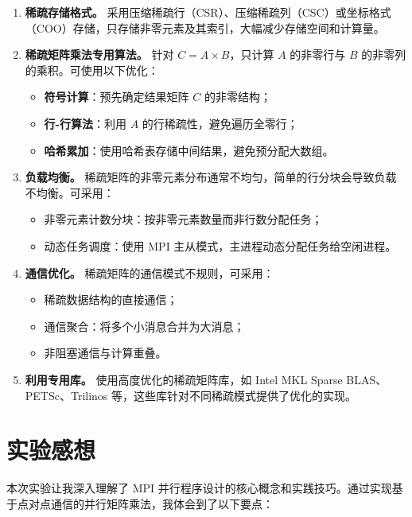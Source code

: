 \documentclass[UTF8,a4paper,12pt]{ctexart}
\begin{document}
\begin{enumerate}[leftmargin=2.2em]
  \item \textbf{稀疏存储格式。} 采用压缩稀疏行（CSR）、压缩稀疏列（CSC）或坐标格式（COO）存储，只存储非零元素及其索引，大幅减少存储空间和计算量。

  \item \textbf{稀疏矩阵乘法专用算法。} 针对 $C = A \times B$，只计算 $A$ 的非零行与 $B$ 的非零列的乘积。可使用以下优化：
  \begin{itemize}
    \item \textbf{符号计算}：预先确定结果矩阵 $C$ 的非零结构；
    \item \textbf{行-行算法}：利用 $A$ 的行稀疏性，避免遍历全零行；
    \item \textbf{哈希累加}：使用哈希表存储中间结果，避免预分配大数组。
  \end{itemize}

  \item \textbf{负载均衡。} 稀疏矩阵的非零元素分布通常不均匀，简单的行分块会导致负载不均衡。可采用：
  \begin{itemize}
    \item 非零元素计数分块：按非零元素数量而非行数分配任务；
    \item 动态任务调度：使用 MPI 主从模式，主进程动态分配任务给空闲进程。
  \end{itemize}

  \item \textbf{通信优化。} 稀疏矩阵的通信模式不规则，可采用：
  \begin{itemize}
    \item 稀疏数据结构的直接通信；
    \item 通信聚合：将多个小消息合并为大消息；
    \item 非阻塞通信与计算重叠。
  \end{itemize}

  \item \textbf{利用专用库。} 使用高度优化的稀疏矩阵库，如 Intel MKL Sparse BLAS、PETSc、Trilinos 等，这些库针对不同稀疏模式提供了优化的实现。
\end{enumerate}

\section{实验感想}

本次实验让我深入理解了 MPI 并行程序设计的核心概念和实践技巧。通过实现基于点对点通信的并行矩阵乘法，我体会到了以下要点：
\end{document}
